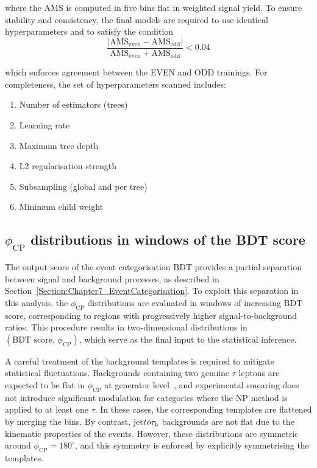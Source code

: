 where the \ac{AMS} is computed in five bins flat in weighted signal yield. To ensure stability and consistency, the final models are required to use identical hyperparameters and to satisfy the condition
\begin{equation}
\frac{|\mathrm{AMS}_{\text{even}} - \mathrm{AMS}_{\text{odd}}|}{\mathrm{AMS}_{\text{even}} + \mathrm{AMS}_{\text{odd}}} < 0.04
\end{equation}

which enforces agreement between the EVEN and ODD trainings. For completeness, the set of hyperparameters scanned includes: 
\begin{enumerate}[label=(\roman*)]
    \item Number of estimators (trees)  
    \item Learning rate  
    \item Maximum tree depth  
    \item L2 regularisation strength  
    \item Subsampling (global and per tree)  
    \item Minimum child weight  
\end{enumerate}

\subsection{\texorpdfstring{$\phi_\text{CP}$}{phicp} distributions in windows of the BDT score}

The output score of the event categorisation BDT provides a partial separation between signal and background processes, as described in Section~\ref{Section:Chapter7_EventCategorisation}. 
To exploit this separation in this analysis, the $\phi_{\mathrm{CP}}$ distributions are evaluated in windows of increasing BDT score, corresponding to regions with progressively higher signal-to-background ratios. 
This procedure results in two-dimensional distributions in $(\text{BDT score},\,\phi_{\mathrm{CP}})$, which serve as the final input to the statistical inference.  

A careful treatment of the background templates is required to mitigate statistical fluctuations. Backgrounds containing two genuine $\tau$ leptons are expected to be flat in $\phi_{\mathrm{CP}}$ at generator level~\cite{Berge:2014sra}, and experimental smearing does not introduce significant modulation for categories where the \ac{NP} method is applied to at least one $\tau$. In these cases, the corresponding templates are flattened by merging the bins. By contrast, jet$to\tau_\mathrm{h}$ backgrounds are not flat due to the kinematic properties of the events. However, these distributions are symmetric around $\phi_{\mathrm{CP}} = 180^\circ$, and this symmetry is enforced by explicitly symmetrising the templates.

